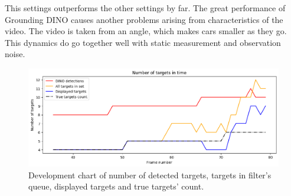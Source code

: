 This settings outperforms the other settings by far. The great performance of Grounding DINO causes another problems arising from characteristics of the video. The video is taken from an angle, which makes cars smaller as they go. This dynamics do go together well with static measurement and observation noise.

\begin{figure}[H]
    \centering
    \includegraphics[width=\linewidth]{../../../experiments/E1/V1/DINO/dino_det}
    \caption{Development chart of number of detected targets, targets in filter's queue, displayed targets and true targets' count.}
    \label{gr:E1-V1-S3}
\end{figure}

